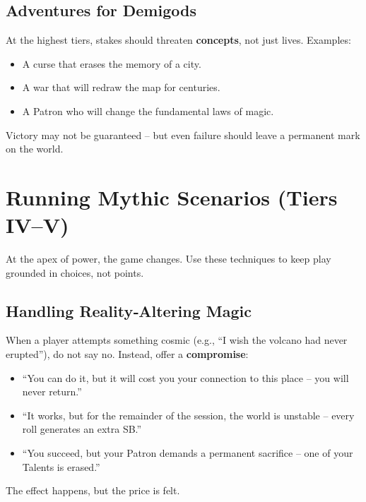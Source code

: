 \subsection*{Adventures for Demigods}
At the highest tiers, stakes should threaten \textbf{concepts}, not just lives. Examples:
\begin{itemize}
  \item A curse that erases the memory of a city.
  \item A war that will redraw the map for centuries.
  \item A Patron who will change the fundamental laws of magic.
\end{itemize}
Victory may not be guaranteed – but even failure should leave a permanent mark on the world.

\section{Running Mythic Scenarios (Tiers IV–V)}

At the apex of power, the game changes. Use these techniques to keep play grounded in choices, not points.

\subsection*{Handling Reality‑Altering Magic}
When a player attempts something cosmic (e.g., “I wish the volcano had never erupted”), do not say no. Instead, offer a \textbf{compromise}:
\begin{itemize}
  \item “You can do it, but it will cost you your connection to this place – you will never return.”
  \item “It works, but for the remainder of the session, the world is unstable – every roll generates an extra SB.”
  \item “You succeed, but your Patron demands a permanent sacrifice – one of your Talents is erased.”
\end{itemize}
The effect happens, but the price is felt.

